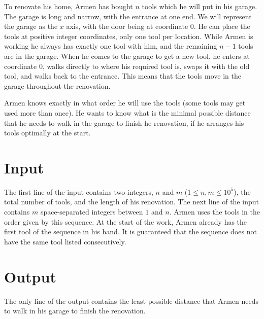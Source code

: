 
To renovate his home, Armen has bought $n$ tools which he will put in his garage.
The garage is long and narrow, with the entrance at one end.
We will represent the garage as the $x$ axis, with the door being at coordinate $0$.
He can place the tools at positive integer coordinates, only one tool per location.
While Armen is working he always has exactly one tool with him, and the remaining $n - 1$ tools are in the garage.
When he comes to the garage to get a new tool, he enters at coordinate 0, walks directly to where his required tool is, swaps it with the old tool, and walks back to the entrance.
This means that the tools move in the garage throughout the renovation.

Armen knows exactly in what order he will use the tools (some tools may get used more than once).
He wants to know what is the minimal possible distance that he needs to walk in the garage to finish he renovation, if he arranges his tools optimally at the start.

\section*{Input}
The first line of the input contains two integers, $n$ and $m$ ($1 \leq n, m \leq 10^5$), the total number of tools, and the length of his renovation.
The next line of the input contains $m$ space-separated integers between $1$ and $n$.
Armen uses the tools in the order given by this sequence.
At the start of the work, Armen already has the first tool of the sequence in his hand.
It is guaranteed that the sequence does not have the same tool listed consecutively.

\section*{Output}
The only line of the output contains the least possible distance that Armen needs to walk in his garage to finish the renovation.
